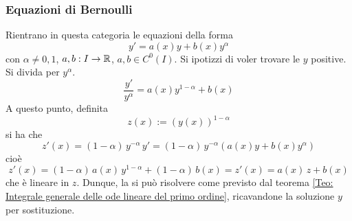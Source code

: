 \subsubsection{Equazioni di Bernoulli}
Rientrano in questa categoria le equazioni della forma
\begin{equation} \label{Eq: Equazione di Bernoulli}
    y'=a(x)y+ b(x)y^{\alpha}
\end{equation}
con $\alpha \neq 0, 1$, $a, b: I \to \mathbb{R}$, $a,b \in C^0(I)$. Si ipotizzi di voler trovare le $y$ positive.
Si divida per $y^\alpha$.
\begin{equation*}
    \frac{y'}{y^\alpha}=a(x)y^{1-\alpha}+ b(x)
\end{equation*}
A questo punto, definita
\begin{equation*}
    z(x):= \left(y(x)\right)^{1-\alpha}
\end{equation*}
si ha che
\begin{equation*}
    z'(x)=(1-\alpha)\, y^{-\alpha}\,y'=(1-\alpha)\,y^{-\alpha}\left( a(x)y+ b(x)y^{\alpha}\right)
\end{equation*}
cioè
\begin{equation*}
    z'(x)=(1-\alpha)\,a(x)\,y^{1-\alpha}+ (1-\alpha)\, b(x) = z'(x)=a(x)\,z+b(x)
\end{equation*}
che è lineare in $z$. Dunque, la si può risolvere come previsto dal teorema \eqref{Teo: Integrale generale delle ode lineare del primo ordine}, ricavandone la soluzione $y$ per sostituzione.
